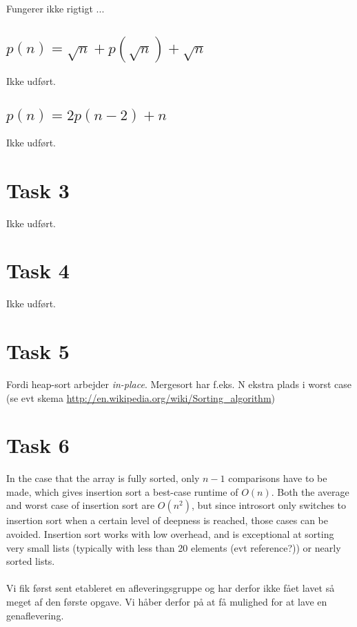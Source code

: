 \documentclass[paper=a4, fleqn]{article}
\begin{document}
Fungerer ikke rigtigt ...

\subsection*{$p(n)=\sqrt{n}+p(\sqrt{n})+\sqrt{n}$}

Ikke udført.

\subsection*{$p(n)=2p(n-2)+n$}

Ikke udført.

\section*{Task 3}

Ikke udført.

\section*{Task 4}

Ikke udført.

\section*{Task 5}

Fordi heap-sort arbejder {\em in-place}. Mergesort har f.eks. N ekstra plads i
worst case (se evt skema \url{http://en.wikipedia.org/wiki/Sorting_algorithm})

\section*{Task 6}

In the case that the array is fully sorted, only $n-1$ comparisons have to be
made, which gives insertion sort a best-case runtime of $O(n)$. Both the average
and worst case of insertion sort are $O(n^2)$, but since introsort only switches
to insertion sort when a certain level of deepness is reached, those cases can
be avoided. Insertion sort works with low overhead, and is exceptional at
sorting very small lists (typically with less than 20 elements (evt reference?))
or nearly sorted lists.

\paragraph{}

Vi fik først sent etableret en afleveringsgruppe og har derfor ikke fået lavet
så meget af den første opgave. Vi håber derfor på at få mulighed for at lave en
genaflevering.
\end{document}
